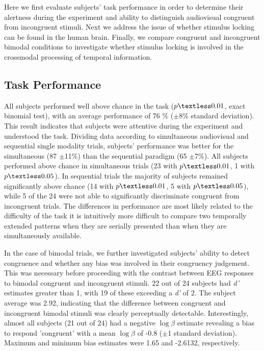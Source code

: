 



Here we first evaluate subjects' task performance in order to determine
their alertness during the experiment and ability to distinguish
audiovisual congruent from incongruent stimuli. Next we address the issue
of whether stimulus locking can be found in the human brain. Finally, we
compare congruent and incongruent bimodal conditions to investigate whether
stimulus locking is involved in the crossmodal processing of temporal
information. 

\subsection{Task Performance}

All subjects performed well above chance in the task ($p \textless 0.01$,
exact binomial test), with an average performance of 76 \% ($\pm$8\%
standard deviation). This result indicates that subjects were attentive
during the experiment and understood the task. Dividing data according to
simultaneous audiovisual and sequential single modality trials, subjects'
performance was better for the simultaneous (87 $\pm$11\%) than the
sequential paradigm (65 $\pm$7\%). All subjects performed above chance in
simultaneous trials (23 with $p \textless 0.01$, 1 with $p \textless
0.05$).  In sequential trials the majority of subjects remained
significantly above chance (14 with $p \textless 0.01$, 5 with $p \textless
0.05$), while 5 of the 24 were not able to significantly discriminate
congruent from incongruent trials. The differences in performance are most
likely related to the difficulty of the task \textemdash it is intuitively
more difficult to compare two temporally extended patterns when they are
serially presented than when they are simultaneously available.



In the case of bimodal trials, we further investigated subjects' ability to
detect congruence and whether any bias was involved in their congruency
judgement. This was necessary before proceeding with the contrast between
EEG responses to bimodal congruent and incongruent stimuli. 22 out of 24
subjects had \textit{d'} estimates greater than 1, with 19 of these
exceeding a \textit{d'} of 2. The subject average was 2.92, indicating that
the difference between congruent and incongruent bimodal stimuli was
clearly perceptually detectable. Interestingly, almost all subjects (21 out
of 24) had a negative $\log{\beta}$ estimate revealing a bias to respond
'congruent' with a mean $\log{\beta}$ of -0.8 ($ \pm$1 standard deviation).
Maximum and minimum bias estimates were 1.65 and -2.6132, respectively. 



